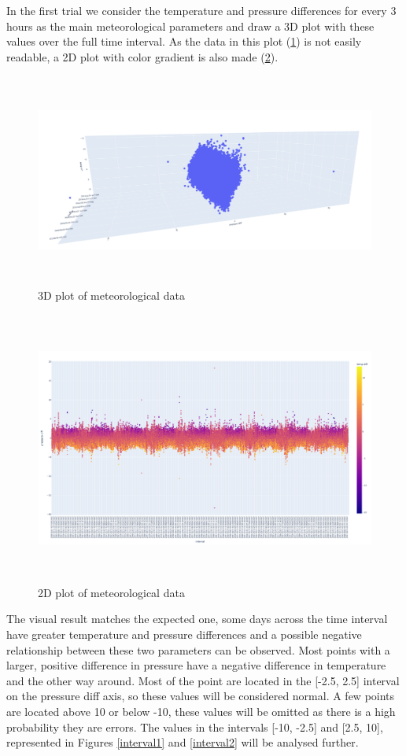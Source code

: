 \documentclass{article}
\begin{document}
In the first trial we consider the temperature and pressure differences for every 3 hours as the main meteorological parameters and draw a 3D plot with these values over the full time interval. As the data in this plot (\ref{figure3D}) is not easily readable, a 2D plot with color gradient is also made (\ref{figure2DColor}). 

\begin{figure}[ht] 
\centering
\includegraphics[height=7cm]{3dPlot.png} 
\caption{3D plot of meteorological data}
\label{figure3D}
\end{figure}

\begin{figure}[h!] 
\centering
\includegraphics[height=9cm]{newplot (1).png}
\caption{2D plot of meteorological data} 
\label{figure2DColor}
\end{figure}

\newpage

The visual result matches the expected one, some days across the time interval have greater temperature and pressure differences and a possible negative relationship between these two parameters can be observed. Most points with a larger, positive difference in pressure have a negative difference in temperature and the other way around. Most of the point are located in the [-2.5, 2.5] interval on the pressure diff axis, so these values will be considered normal. A few points are located above 10 or below -10, these values will be omitted as there is a high probability they are errors. The values in the intervals [-10, -2.5] and [2.5, 10], represented in Figures \ref{interval1} and \ref{interval2} will be analysed further.
\end{document}
